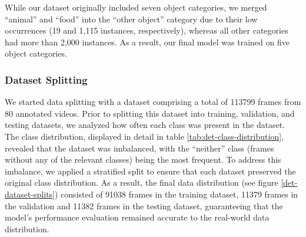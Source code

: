 \documentclass[
  man,floatsintext]{apa6}
\begin{document}
While our dataset originally included seven object categories, we merged ``animal'' and ``food'' into the ``other object'' category due to their low occurrences (19 and 1,115 instances, respectively), whereas all other categories had more than 2,000 instances. As a result, our final model was trained on five object categories.

\subsubsection{Dataset Splitting}\label{dataset-splitting}

We started data splitting with a dataset comprising a total of 113799 frames from 80 annotated videos. Prior to splitting this dataset into training, validation, and testing datasets, we analyzed how often each class was present in the dataset. The class distribution, displayed in detail in table \ref{tab:det-class-distribution}, revealed that the dataset was imbalanced, with the ``neither'' class (frames without any of the relevant classes) being the most frequent. To address this imbalance, we applied a stratified split to ensure that each dataset preserved the original class distribution. As a result, the final data distribution (see figure \ref{det-dataset-splits}) consisted of 91038 frames in the training dataset, 11379 frames in the validation and 11382 frames in the testing dataset, guaranteeing that the model's performance evaluation remained accurate to the real-world data distribution.
\end{document}
